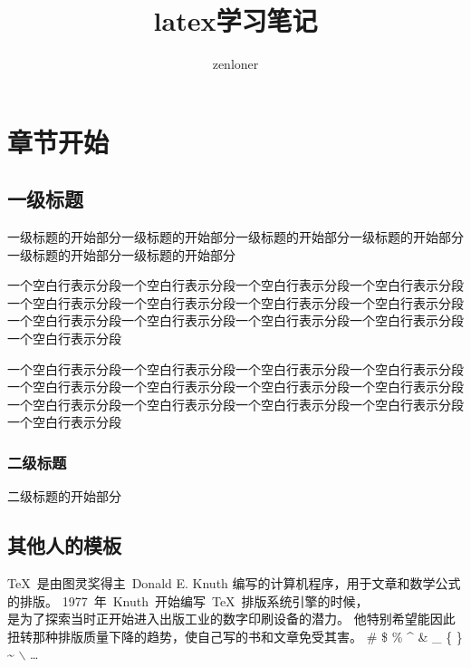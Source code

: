 \documentclass[11pt, a4paper, twoside, openany]{book}
\begin{document}
\title{latex学习笔记}
\author{zenloner}
\maketitle

\tableofcontents
\setlength{\parskip}{1em}

\chapter{章节开始}
\section{一级标题}
一级标题的开始部分一级标题的开始部分一级标题的开始部分一级标题的开始部分一级标题的开始部分一级标题的开始部分

一个空白行表示分段一个空白行表示分段一个空白行表示分段一个空白行表示分段一个空白行表示分段一个空白行表示分段一个空白行表示分段一个空白行表示分段一个空白行表示分段一个空白行表示分段一个空白行表示分段一个空白行表示分段一个空白行表示分段

一个空白行表示分段一个空白行表示分段一个空白行表示分段一个空白行表示分段一个空白行表示分段一个空白行表示分段一个空白行表示分段一个空白行表示分段一个空白行表示分段一个空白行表示分段一个空白行表示分段一个空白行表示分段一个空白行表示分段

\subsection{二级标题}
二级标题的开始部分

\iffalse %
This is a comment example.
\fi

\section{其他人的模板}
\TeX{}~是由图灵奖得主~Donald E. Knuth
编写的计算机程序，用于文章和数学公式的排版。
1977~年~Knuth~开始编写~\TeX{}~排版系统引擎的时候，\\ %
是为了探索当时正开始进入出版工业的数字印刷设备的潜力。 \newline %
他特别希望能因此扭转那种排版质量下降的趋势，使自己写的书和文章免受其害。
\# \$ \% \^{} \& \_ \{ \} \~{} $\backslash$ \ldots
\end{document}
